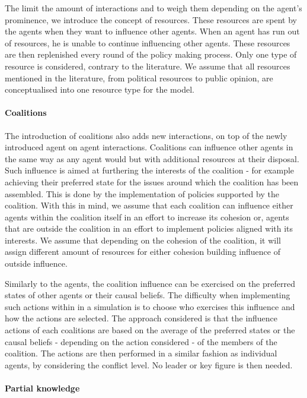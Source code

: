 \documentclass[11pt]{article}
\begin{document}
The limit the amount of interactions and to weigh them depending on the agent's prominence, we introduce the concept of resources. These resources are spent by the agents when they want to influence other agents. When an agent has run out of resources, he is unable to continue influencing other agents. These resources are then replenished every round of the policy making process. Only one type of resource is considered, contrary to the literature. We assume that all resources mentioned in the literature, from political resources to public opinion, are conceptualised into one resource type for the model.

\paragraph{Coalitions}

The introduction of coalitions also adds new interactions, on top of the newly introduced agent on agent interactions. Coalitions can influence other agents in the same way as any agent would but with additional resources at their disposal. Such influence is aimed at furthering the interests of the coalition - for example achieving their preferred state for the issues around which the coalition has been assembled. This is done by the implementation of policies supported by the coalition. With this in mind, we assume that each coalition can influence either agents within the coalition itself in an effort to increase its cohesion or, agents that are outside the coalition in an effort to implement policies aligned with its interests. We assume that depending on the cohesion of the coalition, it will assign different amount of resources for either cohesion building influence of outside influence. 

Similarly to the agents, the coalition influence can be exercised on the preferred states of other agents or their causal beliefs. The difficulty when implementing such actions within in a simulation is to choose who exercises this influence and how the actions are selected. The approach considered is that the influence actions of each coalitions are based on the average of the preferred states or the causal beliefs - depending on the action considered - of the members of the coalition. The actions are then performed in a similar fashion as individual agents, by considering the conflict level. No leader or key figure is then needed.

\paragraph{Partial knowledge}
\end{document}
